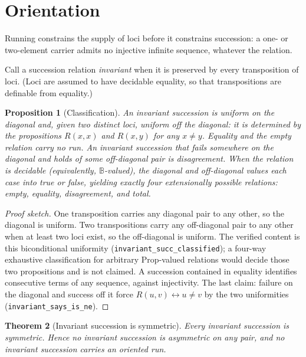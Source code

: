 \documentclass[11pt]{article}
\newtheorem{theorem}{Theorem}[section]
\newtheorem{proposition}[theorem]{Proposition}
\newcommand{\lf}[1]{\texttt{#1}}
\newcommand{\B}{\mathbb{B}}
\begin{document}
\section{Orientation}
\label{sec:orientation}

Running constrains the supply of loci before it constrains succession: a
one- or two-element carrier admits no injective infinite sequence, whatever the
relation.

Call a succession relation \emph{invariant} when it is preserved by every
transposition of loci. (Loci are assumed to have decidable equality, so that
transpositions are definable from equality.)

\begin{proposition}[Classification]
\label{prop:invsucc}
An invariant succession is uniform on the diagonal and, given two distinct
loci, uniform off the diagonal: it is determined by the propositions
\(R(x,x)\) and \(R(x,y)\) for any \(x\neq y\). Equality and the empty relation
carry no run. An invariant succession that fails somewhere on the diagonal and
holds of some off-diagonal pair is disagreement. When the relation is
decidable (equivalently, \(\B\)-valued), the diagonal and off-diagonal values
each case into true or false, yielding exactly four extensionally possible
relations: empty, equality, disagreement, and total.
\end{proposition}

\begin{proof}[Proof sketch]
One transposition carries any diagonal pair to any other, so the diagonal is
uniform. Two transpositions carry any off-diagonal pair to any other when at
least two loci exist, so the off-diagonal is uniform. The verified content is
this biconditional uniformity (\lf{invariant\_succ\_classified}); a four-way
exhaustive classification for arbitrary \(\mathrm{Prop}\)-valued relations would
decide those two propositions and is not claimed. A succession contained in
equality identifies consecutive terms of any sequence, against injectivity.
The last claim: failure on the diagonal and success off it force
\(R(u,v)\leftrightarrow u\neq v\) by the two uniformities
(\lf{invariant\_says\_is\_ne}).
\end{proof}

\begin{theorem}[Invariant succession is symmetric]
\label{thm:orientation}
Every invariant succession is symmetric. Hence no invariant succession is
asymmetric on any pair, and no invariant succession carries an oriented run.
\end{theorem}
\end{document}
